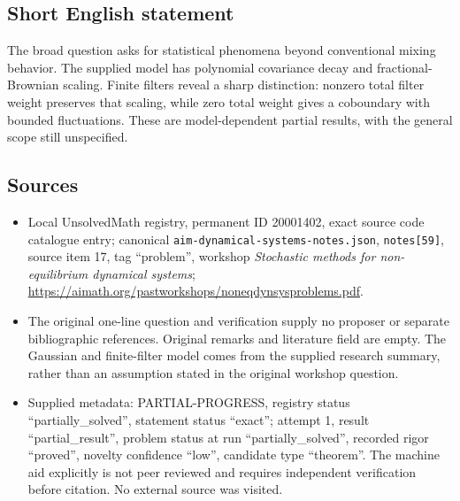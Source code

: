 \documentclass[11pt]{article}
\begin{document}
\subsection{Short English statement}
The broad question asks for statistical phenomena beyond conventional mixing behavior. The supplied model has polynomial covariance decay and fractional-Brownian scaling. Finite filters reveal a sharp distinction: nonzero total filter weight preserves that scaling, while zero total weight gives a coboundary with bounded fluctuations. These are model-dependent partial results, with the general scope still unspecified.
\subsection{Sources}
\begin{itemize}
\item Local UnsolvedMath registry, permanent ID 20001402, exact source code catalogue entry; canonical \texttt{aim-dynamical-systems-notes.json}, \texttt{notes[59]}, source item 17, tag ``problem'', workshop \emph{Stochastic methods for non-equilibrium dynamical systems}; \url{https://aimath.org/pastworkshops/noneqdynsysproblems.pdf}.
\item The original one-line question and verification supply no proposer or separate bibliographic references. Original remarks and literature field are empty. The Gaussian and finite-filter model comes from the supplied research summary, rather than an assumption stated in the original workshop question.
\item Supplied metadata: PARTIAL-PROGRESS, registry status ``partially\_solved'', statement status ``exact''; attempt 1, result ``partial\_result'', problem status at run ``partially\_solved'', recorded rigor ``proved'', novelty confidence ``low'', candidate type ``theorem''. The machine aid explicitly is not peer reviewed and requires independent verification before citation. No external source was visited.
\end{itemize}
\end{document}
